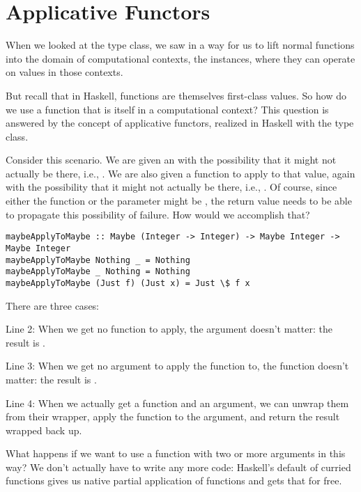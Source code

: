 \section{Applicative Functors}

When we looked at the  type class, we saw in  a way for us to lift
normal functions into the domain of computational contexts, the  instances, where
they can operate on values in those contexts.

But recall that in Haskell, functions are themselves first-class values. So how do we use a function
that is itself in a computational context? This question is answered by the concept of applicative
functors, realized in Haskell with the  type class.

Consider this scenario. We are given an  with the possibility that it might not
actually be there, i.e., . We are also given a function to apply to that value,
again with the possibility that it might not actually be there, i.e., .
Of course, since either the function or the parameter might be , the return value needs
to be able to propagate this possibility of failure. How would we accomplish that?

\begin{lstlisting}
maybeApplyToMaybe :: Maybe (Integer -> Integer) -> Maybe Integer -> Maybe Integer
maybeApplyToMaybe Nothing _ = Nothing
maybeApplyToMaybe _ Nothing = Nothing
maybeApplyToMaybe (Just f) (Just x) = Just \$ f x
\end{lstlisting}

There are three cases:

\begin{notelist}
    \item Line 2: When we get no function to apply, the argument doesn't matter: the result is .
    \item Line 3: When we get no argument to apply the function to, the function doesn't matter: the result is .
    \item Line 4: When we actually get a function and an argument, we can unwrap them from their  wrapper,
          apply the function to the argument, and return the result wrapped back up.
\end{notelist}

What happens if we want to use a function with two or more arguments in this way? We don't actually have to write any more
code: Haskell's default of curried functions gives us native partial application of functions and 
gets that for free.

